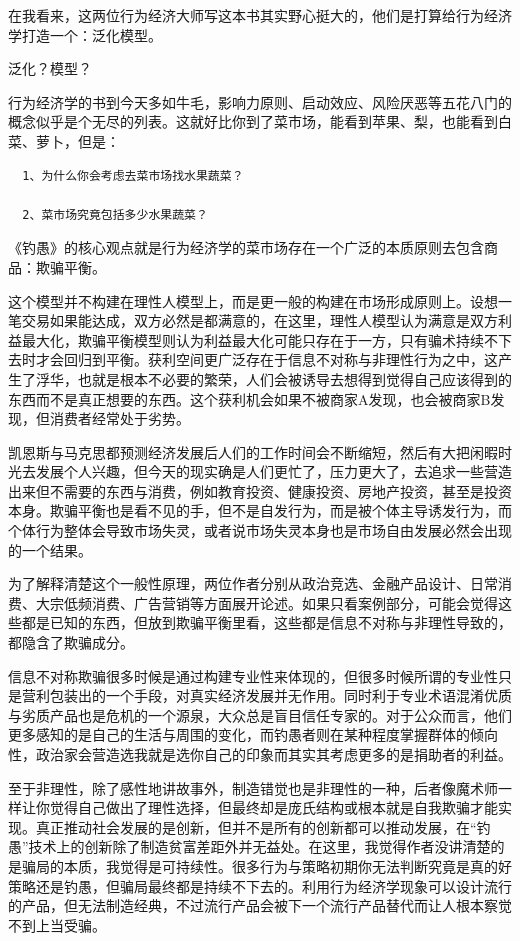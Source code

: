 \documentclass[]{book}
\begin{document}
在我看来，这两位行为经济大师写这本书其实野心挺大的，他们是打算给行为经济学打造一个：泛化模型。

泛化？模型？

行为经济学的书到今天多如牛毛，影响力原则、启动效应、风险厌恶等五花八门的概念似乎是个无尽的列表。这就好比你到了菜市场，能看到苹果、梨，也能看到白菜、萝卜，但是：

\begin{verbatim}
  1、为什么你会考虑去菜市场找水果蔬菜？

  2、菜市场究竟包括多少水果蔬菜？
\end{verbatim}

《钓愚》的核心观点就是行为经济学的菜市场存在一个广泛的本质原则去包含商品：欺骗平衡。

这个模型并不构建在理性人模型上，而是更一般的构建在市场形成原则上。设想一笔交易如果能达成，双方必然是都满意的，在这里，理性人模型认为满意是双方利益最大化，欺骗平衡模型则认为利益最大化可能只存在于一方，只有骗术持续不下去时才会回归到平衡。获利空间更广泛存在于信息不对称与非理性行为之中，这产生了浮华，也就是根本不必要的繁荣，人们会被诱导去想得到觉得自己应该得到的东西而不是真正想要的东西。这个获利机会如果不被商家A发现，也会被商家B发现，但消费者经常处于劣势。

凯恩斯与马克思都预测经济发展后人们的工作时间会不断缩短，然后有大把闲暇时光去发展个人兴趣，但今天的现实确是人们更忙了，压力更大了，去追求一些营造出来但不需要的东西与消费，例如教育投资、健康投资、房地产投资，甚至是投资本身。欺骗平衡也是看不见的手，但不是自发行为，而是被个体主导诱发行为，而个体行为整体会导致市场失灵，或者说市场失灵本身也是市场自由发展必然会出现的一个结果。

为了解释清楚这个一般性原理，两位作者分别从政治竞选、金融产品设计、日常消费、大宗低频消费、广告营销等方面展开论述。如果只看案例部分，可能会觉得这些都是已知的东西，但放到欺骗平衡里看，这些都是信息不对称与非理性导致的，都隐含了欺骗成分。

信息不对称欺骗很多时候是通过构建专业性来体现的，但很多时候所谓的专业性只是营利包装出的一个手段，对真实经济发展并无作用。同时利于专业术语混淆优质与劣质产品也是危机的一个源泉，大众总是盲目信任专家的。对于公众而言，他们更多感知的是自己的生活与周围的变化，而钓愚者则在某种程度掌握群体的倾向性，政治家会营造选我就是选你自己的印象而其实其考虑更多的是捐助者的利益。

至于非理性，除了感性地讲故事外，制造错觉也是非理性的一种，后者像魔术师一样让你觉得自己做出了理性选择，但最终却是庞氏结构或根本就是自我欺骗才能实现。真正推动社会发展的是创新，但并不是所有的创新都可以推动发展，在``钓愚''技术上的创新除了制造贫富差距外并无益处。在这里，我觉得作者没讲清楚的是骗局的本质，我觉得是可持续性。很多行为与策略初期你无法判断究竟是真的好策略还是钓愚，但骗局最终都是持续不下去的。利用行为经济学现象可以设计流行的产品，但无法制造经典，不过流行产品会被下一个流行产品替代而让人根本察觉不到上当受骗。
\end{document}
